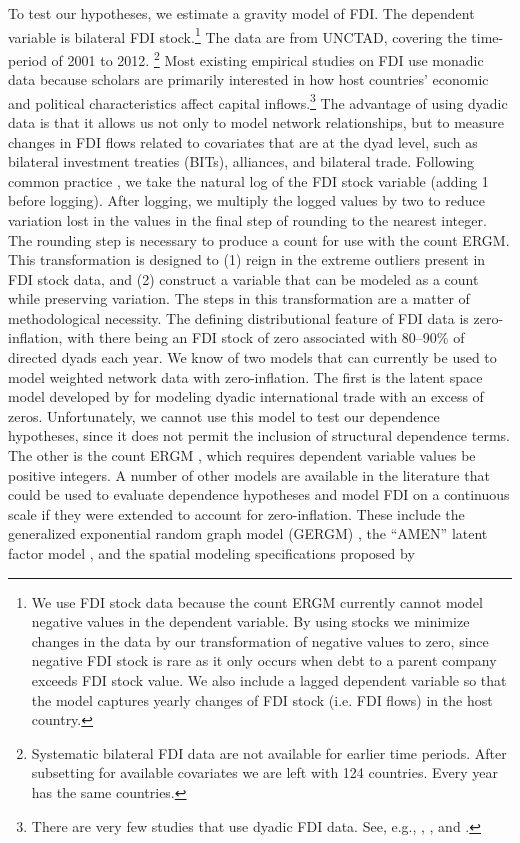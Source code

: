 \documentclass[reqno,onecolumn,letterpaper,12pt]{article}
\begin{document}
To test our hypotheses, we estimate a gravity model of FDI. %
The dependent variable is bilateral FDI stock.\footnote{ We use FDI stock data because the count ERGM currently cannot model negative values in the dependent variable. By using stocks we minimize changes in the data by our transformation of negative values to zero, since negative FDI stock is rare as it only occurs when debt to a parent company exceeds FDI stock value. We also include a lagged dependent variable so that the model captures yearly changes of FDI stock (i.e. FDI flows) in the host country.} The data are from UNCTAD, covering the time-period of 2001 to 2012.%
\footnote{Systematic bilateral FDI data are not available for earlier time periods. After subsetting for available covariates we are left with 124 countries. Every year has the same countries.} Most existing empirical studies on FDI use monadic data because scholars are primarily interested in how host countries' economic and political characteristics affect capital inflows.\footnote{There are very few studies that use dyadic FDI data. See, e.g.,  \citet{Leblang:2010}, \citet{Li_Vashchilko:2010}, and \citet{Razin_et_al:2005}. } The advantage of using dyadic data is that it allows us not only to model network relationships, but to measure changes in FDI flows related to covariates that are at the dyad level, such as bilateral investment treaties (BITs), alliances, and bilateral trade. Following common practice \citep[e.g.,][]{hyun2006quality,benassy2007institutional}, we take the natural log of the FDI stock variable (adding 1 before logging). After logging, we multiply the logged values by two to reduce variation lost in the values in the final step of rounding to the nearest integer. The rounding step is necessary to produce a count for use with the count ERGM. This transformation is designed to (1) reign in the extreme outliers present in FDI stock data, and (2) construct a variable that can be modeled as a count while preserving variation. The steps in this transformation are a matter of methodological necessity.  The defining distributional feature of FDI data is zero-inflation, with there being an FDI stock of zero associated with 80--90\% of directed dyads each year. We know of two models that can currently be used to model weighted network data with zero-inflation. The first is the latent space model developed by \cite{ward2013gravity} for modeling dyadic international trade with an excess of zeros. Unfortunately, we cannot use this model to test our dependence hypotheses, since it does not permit the inclusion of structural dependence terms. The other is the count ERGM \citep{krivitsky2012exponential}, which requires dependent variable values be positive integers. A number of other models are available in the literature that could be used to evaluate dependence hypotheses and model FDI on a continuous scale if they were extended to account for zero-inflation. These include the generalized exponential random graph model (GERGM) \citep{wilson2017stochastic},  the ``AMEN'' latent factor model \citep{minhas2019inferential}, and the spatial modeling specifications proposed by 
\end{document}
